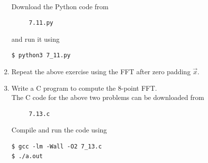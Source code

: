 \documentclass[journal,12pt,twocolumn]{IEEEtran}
\renewcommand\thesection{\arabic{section}}
\begin{document}
\begin{enumerate}[label=\thesection.\arabic*]
     \\
\solution Download the Python code from 
\begin{lstlisting}
     7.11.py
\end{lstlisting}
and run it using
\begin{lstlisting}
$ python3 7_11.py
\end{lstlisting}
\item Repeat the above exercise using the FFT
    after zero padding $\vec{x}$.
\item Write a C program to compute the 8-point FFT. \\
\solution The C code for the above two problems can be downloaded from
\begin{lstlisting}
     7.13.c
\end{lstlisting}
Compile and run the code using
\begin{lstlisting}
$ gcc -lm -Wall -O2 7_13.c
$ ./a.out
\end{lstlisting}
\end{enumerate}
\end{document}
